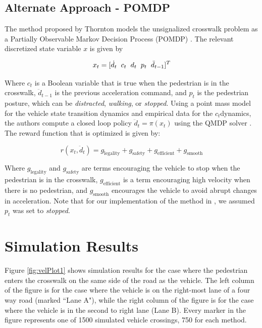 \documentclass[letterpaper, 10 pt, conference]{ieeeconf}  %
\begin{document}
\subsection{Alternate Approach - POMDP}
The method proposed by Thornton \cite{Thornton2018} models the unsignalized crosswalk problem as a Partially 
Observable Markov Decision Process (POMDP) \cite{Kochenderfer}. The relevant discretized state variable $x$ is given by

\begin{equation}
x_t = [\dot{d}_t \hspace{2mm} c_t \hspace{2mm} d_t \hspace{2mm} p_t \hspace{2mm} \ddot{d}_{t-1}]^T
\end{equation}

Where $c_t$ is a Boolean variable that is true when the pedestrian is in the crosswalk, $\ddot{d}_{t-1}$ is the previous acceleration command, and $p_t$ is the pedestrian posture, which can be \textit{distracted}, \textit{walking}, or \textit{stopped}. Using a point mass model for the vehicle state transition dynamics and empirical data for the $c_t$dynamics, the authors compute a closed loop policy $\ddot{d}_t = \pi(x_t)$ using the QMDP solver \cite{QMDP}. The reward function that is optimized is given by: 

\begin{equation}
r(x_t, \ddot{d}_t) = g_\mathrm{legality} + g_\mathrm{safety} + g_\mathrm{efficient} + g_\mathrm{smooth}
\end{equation}

Where $g_\mathrm{legality}$ and $g_\mathrm{safety}$ are terms encouraging the vehicle to stop when the pedestrian is in the crosswalk, $g_\mathrm{efficient}$ is a term encouraging high velocity when there is no pedestrian, and $g_\mathrm{smooth}$ encourages the vehicle to avoid abrupt changes in acceleration. Note that for our implementation of the method in \cite{Thornton2018}, we assumed $p_t$ was set to \textit{stopped}.  

\section{Simulation Results}

Figure \ref{fig:velPlot1} shows simulation results for the case where the pedestrian enters the crosswalk on the same side of the road as the vehicle. The left column of the figure is for the case where the vehicle is on the right-most lane of a four way road (marked ``Lane A"), while the right column of the figure is for the case where the vehicle is in the second to right lane (Lane B). Every marker in the figure represents one of 1500 simulated vehicle crossings, 750 for each method.
\end{document}
